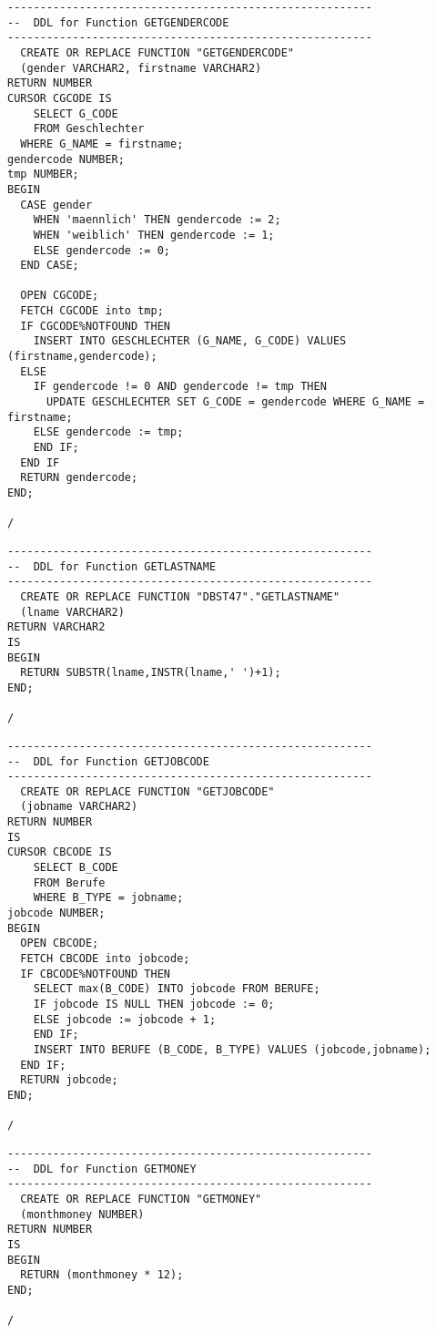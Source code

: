 \documentclass{scrartcl}
\begin{document}
\begin{lstlisting}
--------------------------------------------------------
--  DDL for Function GETGENDERCODE
--------------------------------------------------------
  CREATE OR REPLACE FUNCTION "GETGENDERCODE" 
  (gender VARCHAR2, firstname VARCHAR2)
RETURN NUMBER
CURSOR CGCODE IS
	SELECT G_CODE
	FROM Geschlechter
  WHERE G_NAME = firstname;
gendercode NUMBER;
tmp NUMBER;
BEGIN
  CASE gender
    WHEN 'maennlich' THEN gendercode := 2;
    WHEN 'weiblich' THEN gendercode := 1;
    ELSE gendercode := 0;
  END CASE;

  OPEN CGCODE;
  FETCH CGCODE into tmp;
  IF CGCODE%NOTFOUND THEN
    INSERT INTO GESCHLECHTER (G_NAME, G_CODE) VALUES (firstname,gendercode);
  ELSE 
    IF gendercode != 0 AND gendercode != tmp THEN
      UPDATE GESCHLECHTER SET G_CODE = gendercode WHERE G_NAME = firstname;
    ELSE gendercode := tmp;
    END IF;
  END IF
  RETURN gendercode;
END;

/
\end{lstlisting}

\begin{lstlisting}
--------------------------------------------------------
--  DDL for Function GETLASTNAME
--------------------------------------------------------
  CREATE OR REPLACE FUNCTION "DBST47"."GETLASTNAME" 
  (lname VARCHAR2)
RETURN VARCHAR2
IS
BEGIN
  RETURN SUBSTR(lname,INSTR(lname,' ')+1);
END;

/
\end{lstlisting}

\begin{lstlisting}
--------------------------------------------------------
--  DDL for Function GETJOBCODE
--------------------------------------------------------
  CREATE OR REPLACE FUNCTION "GETJOBCODE" 
  (jobname VARCHAR2)
RETURN NUMBER
IS
CURSOR CBCODE IS
	SELECT B_CODE
	FROM Berufe
	WHERE B_TYPE = jobname;
jobcode NUMBER;
BEGIN
  OPEN CBCODE;
  FETCH CBCODE into jobcode;
  IF CBCODE%NOTFOUND THEN 
    SELECT max(B_CODE) INTO jobcode FROM BERUFE; 
    IF jobcode IS NULL THEN jobcode := 0;
    ELSE jobcode := jobcode + 1;
    END IF;
    INSERT INTO BERUFE (B_CODE, B_TYPE) VALUES (jobcode,jobname); 
  END IF;
  RETURN jobcode;
END;

/
\end{lstlisting}

\begin{lstlisting}
--------------------------------------------------------
--  DDL for Function GETMONEY
--------------------------------------------------------
  CREATE OR REPLACE FUNCTION "GETMONEY" 
  (monthmoney NUMBER)
RETURN NUMBER
IS
BEGIN
  RETURN (monthmoney * 12);
END;

/
\end{lstlisting}
\end{document}
